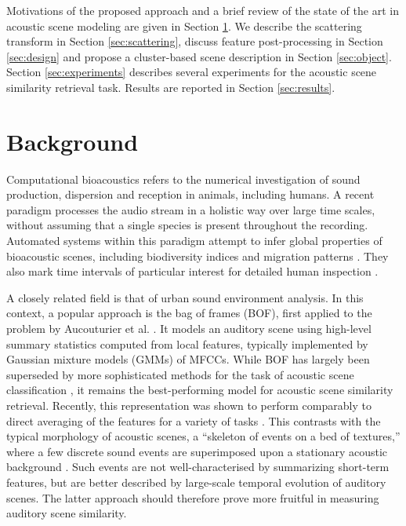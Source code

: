 \documentclass[smallextended]{svjour3}
\begin{document}
Motivations of the proposed approach and a brief review of the state of the art in acoustic scene modeling are given in Section \ref{sec:soa}. We describe the scattering transform in Section \ref{sec:scattering}, discuss feature post-processing in Section \ref{sec:design} and propose a cluster-based scene description in Section \ref{sec:object}. Section \ref{sec:experiments} describes several experiments for the acoustic scene similarity retrieval task. Results are reported in Section \ref{sec:results}.

\section{Background} \label{sec:soa}

Computational bioacoustics refers to the numerical investigation of sound production, dispersion and reception in animals, including humans. A recent paradigm processes the audio stream in a holistic way over large time scales, without assuming that a single species is present throughout the recording. Automated systems within this paradigm attempt to infer global properties of bioacoustic scenes, including biodiversity indices \cite{Bardeli2010} and migration patterns \cite{Obrist2010}. They also mark time intervals of particular interest for detailed human inspection \cite{rosenstock2002landbird}.

A closely related field is that of urban sound environment analysis.
In this context, a popular approach is the bag of frames (BOF), first applied to the problem by Aucouturier et al. \cite{aucouturier2007bag}.
It models an auditory scene using high-level summary statistics computed from local features, typically implemented by Gaussian mixture models (GMMs) of MFCCs.
While BOF has largely been superseded by more sophisticated methods for the task of acoustic scene classification \cite{7100934}, it remains the best-performing model for acoustic scene similarity retrieval.
Recently, this representation was shown to perform comparably to direct averaging of the features for a variety of tasks \cite{lagrange:hal-01082501}.
This contrasts with the typical morphology of acoustic scenes, a ``skeleton of events on a bed of textures,'' where a few discrete sound events are superimposed upon a stationary acoustic background \cite{nelken2013}.
Such events are not well-characterised by summarizing short-term features, but are better described by large-scale temporal evolution of auditory scenes.
The latter approach should therefore prove more fruitful in measuring auditory scene similarity.
\end{document}
